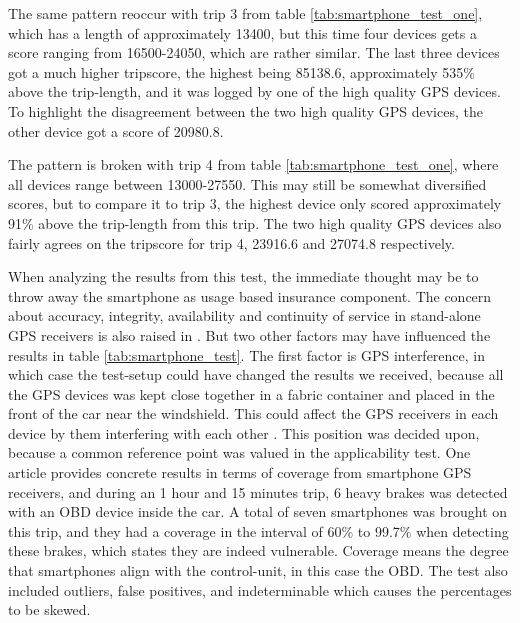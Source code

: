 The same pattern reoccur with trip 3 from table \ref{tab:smartphone_test_one}, which has a length of approximately 13400, but this time four devices gets a score ranging from 16500-24050, which are rather similar. The last three devices got a much higher tripscore, the highest being 85138.6, approximately 535\% above the trip-length, and it was logged by one of the high quality GPS devices. To highlight the disagreement between the two high quality GPS devices, the other device got a score of 20980.8. 

The pattern is broken with trip 4 from table \ref{tab:smartphone_test_one}, where all devices range between 13000-27550. This may still be somewhat diversified scores, but to compare it to trip 3, the highest device only scored approximately 91\% above the trip-length from this trip. The two high quality GPS devices also fairly agrees on the tripscore for trip 4, 23916.6 and 27074.8 respectively. 

When analyzing the results from this test, the immediate thought may be to throw away the smartphone as usage based insurance component. The concern about accuracy, integrity, availability and continuity of service in stand-alone GPS receivers is also raised in\citep{art:challenges_smartphone_ubi} \citep{art:survey_mobile_phone_sensing} \citep{art:smartphones_for_monitoring_and_ubi} \citep{art:insurtelematics} \citep{art:in-car_positioning_technologies}. But two other factors may have influenced the results in table \ref{tab:smartphone_test}. The first factor is GPS interference, in which case the test-setup could have changed the results we received, because all the GPS devices was kept close together in a fabric container and placed in the front of the car near the windshield. This could affect the GPS receivers in each device by them interfering with each other\citep{art:gps_interference_one} \citep{art:gps_interference_two}. This position was decided upon, because a common reference point was valued in the applicability test. One article provides concrete results in terms of coverage from smartphone GPS receivers, and during an 1 hour and 15 minutes trip, 6 heavy brakes was detected with an OBD device inside the car. A total of seven smartphones was brought on this trip, and they had a coverage in the interval of 60\% to 99.7\% when detecting these brakes\citep{art:insurtelematics}, which states they are indeed vulnerable. Coverage means the degree that smartphones align with the control-unit, in this case the OBD. The test also included outliers, false positives, and indeterminable which causes the percentages to be skewed.

